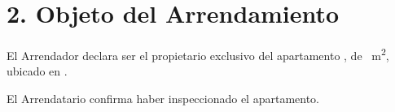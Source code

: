 \section*{2. Objeto del Arrendamiento}
El Arrendador declara ser el propietario exclusivo del apartamento \Propunitnumber, de \Propaream~m\textsuperscript{2}, ubicado en \Propaddress.

El Arrendatario confirma haber inspeccionado el apartamento.
